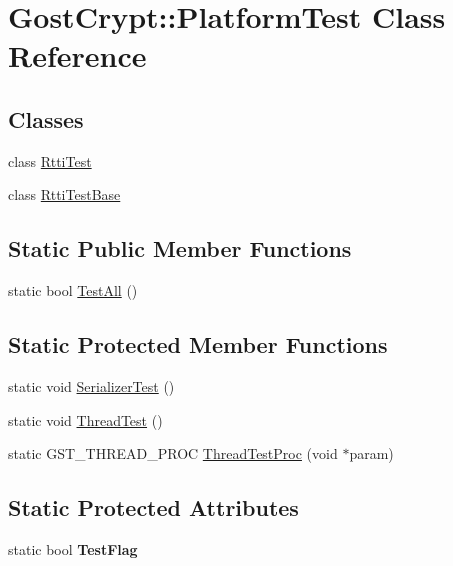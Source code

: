 \hypertarget{class_gost_crypt_1_1_platform_test}{}\section{Gost\+Crypt\+:\+:Platform\+Test Class Reference}
\label{class_gost_crypt_1_1_platform_test}
\subsection*{Classes}
\begin{DoxyCompactItemize}
\item 
class \hyperlink{class_gost_crypt_1_1_platform_test_1_1_rtti_test}{Rtti\+Test}
\item 
class \hyperlink{class_gost_crypt_1_1_platform_test_1_1_rtti_test_base}{Rtti\+Test\+Base}
\end{DoxyCompactItemize}
\subsection*{Static Public Member Functions}
\begin{DoxyCompactItemize}
\item 
static bool \hyperlink{class_gost_crypt_1_1_platform_test_acce72e087247ae6078a2cc0fd432504c}{Test\+All} ()
\end{DoxyCompactItemize}
\subsection*{Static Protected Member Functions}
\begin{DoxyCompactItemize}
\item 
static void \hyperlink{class_gost_crypt_1_1_platform_test_a32e037830a73167f9ac0ce5dc42cb84f}{Serializer\+Test} ()
\item 
static void \hyperlink{class_gost_crypt_1_1_platform_test_afd983c7319d867abaa763a328338f341}{Thread\+Test} ()
\item 
static G\+S\+T\+\_\+\+T\+H\+R\+E\+A\+D\+\_\+\+P\+R\+OC \hyperlink{class_gost_crypt_1_1_platform_test_ae93b6750075cdc4298d18d9080351225}{Thread\+Test\+Proc} (void $\ast$param)
\end{DoxyCompactItemize}
\subsection*{Static Protected Attributes}
\begin{DoxyCompactItemize}
\item 
\mbox{\label{class_gost_crypt_1_1_platform_test_abac8b798dc51e9f74ffcb3f0a9b60ecf}} 
static bool {\bfseries Test\+Flag}
\end{DoxyCompactItemize}



